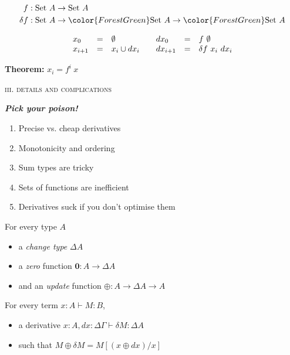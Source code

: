 \documentclass[dvipsnames]{beamer}
\newcommand\G\Gamma
\newcommand\D\Delta
\newcommand{\mb}{\mathbf}
\newcommand\tpname[1]{\mathrm{#1}}
\newcommand\tset{\tpname{Set}~}
\newcommand\zero{\mb{0}}
\newcommand{\changecolor}{\color{ForestGreen}}
\begin{document}
\begin{frame}
  \Large
  \begin{align*}
    f &: \tset{A} \to \tset{A}\\
    \delta f &: \tset{A} \to {\changecolor\tset{A}} \to {\changecolor\tset{A}}
  \end{align*}

  \pause
  \vspace{.5em}
  \[\begin{array}{lcl@{\hspace{2em}}lcl}
    x_0 &=& \emptyset
    & dx_0 &=& f ~\emptyset\\
    x_{i+1} &=& x_i \cup dx_i
    & dx_{i+1} &=& \delta f ~x_i ~dx_i\\
  \end{array}\]

  \vspace{1em}
  \textbf{Theorem:} $x_i = f^i~x$
\end{frame}


\begin{frame}
  \centering\huge{\scshape iii. details and complications}

  \Large
  \textbf{\itshape Pick your poison!}
  \begin{enumerate}
  \item Precise vs. cheap derivatives
  \item Monotonicity and ordering
  \item Sum types are tricky
  \item Sets of functions are inefficient
  \item Derivatives suck if you don't optimise them
  \end{enumerate}
\end{frame}

\begin{frame}\Large
  For every type $A$
  \begin{itemize}
  \item a \emph{change type} $\D A$
  \item a \emph{zero} function $\zero : A \to \D A$
  \item and an \emph{update} function $\oplus : A \to \D A \to A$
  \end{itemize}
  \vspace{1.5em}

  For every term $x : A \vdash M : B$,
  \begin{itemize}
  \item a derivative $x : A, dx : \D\G \vdash \delta M : \D A$
  \item such that $M \oplus \delta M = M[(x\oplus dx)/x]$
  \end{itemize}
\end{frame}
\end{document}
